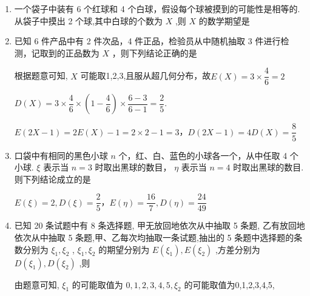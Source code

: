 \begin{enumerate}
\begin{enumerate}
        \item 一个袋子中装有 6 个红球和 4 个白球，假设每个球被摸到的可能性是相等的. 从袋子中摸出 2 个球,其中白球的个数为 $X$ ,则 $X$ 的数学期望是
    \item 已知 6 件产品中有 2 件次品，4 件正品，检验员从中随机抽取 3 件进行检测，记取到的正品数为 $X$ ，则下列结论正确的是
    \begin{jieda}
        根据题意可知, $X$ 可能取1,2,3,且服从超几何分布，故$E\left( X\right)  = 3 \times \dfrac{4}{6} = 2$
        
        $D\left( X\right)  = 3 \times \dfrac{4}{6} \times \left(1-\dfrac{4}{6}\right)\times \dfrac{6-3}{6-1} = \dfrac{2}{5}.$
        
        $E\left( {{2X} - 1}\right)  = {2E}\left( X\right)  - 1 = 2 \times  2 - 1 = 3$，$D\left( {{2X} - 1}\right)  = {4D}\left( X\right)  = \dfrac{8}{5}$
    \end{jieda}
    
    \item 口袋中有相同的黑色小球 $n$ 个，红、白、蓝色的小球各一个，从中任取 4 个小球. $\xi$ 表示当 $n = 3$ 时取出黑球的数目， $\eta$ 表示当 $n = 4$ 时取出黑球的数目. 则下列结论成立的是
    \begin{jieda}
        $E\left( \xi \right)  = 2,D\left( \xi \right) =\dfrac{2}{5}$，$E\left( \eta \right)  = \dfrac{16}{7}, D\left( \eta \right)  = \dfrac{24}{49}$
    \end{jieda}

    
        \item 已知 20 条试题中有 8 条选择题, 甲无放回地依次从中抽取 5 条题, 乙有放回地依次从中抽取 5 条题,甲、乙每次均抽取一条试题,抽出的 5 条题中选择题的条数分别为 ${\xi }_{1},{\xi }_{2}$ , ${\xi }_{1},{\xi }_{2}$ 的期望分别为 $E\left( {\xi }_{1}\right) ,E\left( {\xi }_{2}\right)$ ,方差分别为 $D\left( {\xi }_{1}\right) ,D\left( {\xi }_{2}\right)$ ,则
        \begin{jieda}
            由题意可知, ${\xi }_{1}$ 的可能取值为 $0,1,2,3,4,5,{\xi }_{2}$ 的可能取值为0,1,2,3,4,5,
            

\end{jieda}
\end{enumerate}
\end{enumerate}
